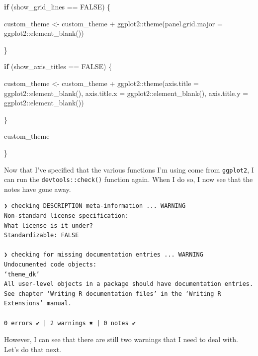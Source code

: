 \documentclass[
]{book}
\newenvironment{Shaded}{\begin{snugshade}}{\end{snugshade}}
\newcommand{\AttributeTok}[1]{\textcolor[rgb]{0.77,0.63,0.00}{#1}}
\newcommand{\ConstantTok}[1]{\textcolor[rgb]{0.00,0.00,0.00}{#1}}
\newcommand{\ControlFlowTok}[1]{\textcolor[rgb]{0.13,0.29,0.53}{\textbf{#1}}}
\newcommand{\FunctionTok}[1]{\textcolor[rgb]{0.00,0.00,0.00}{#1}}
\newcommand{\NormalTok}[1]{#1}
\newcommand{\OtherTok}[1]{\textcolor[rgb]{0.56,0.35,0.01}{#1}}
\newcommand{\SpecialCharTok}[1]{\textcolor[rgb]{0.00,0.00,0.00}{#1}}
\begin{document}
\begin{Shaded}
\begin{Highlighting}[]
  \ControlFlowTok{if}\NormalTok{ (show\_grid\_lines }\SpecialCharTok{==} \ConstantTok{FALSE}\NormalTok{) \{}
    
\NormalTok{    custom\_theme }\OtherTok{\textless{}{-}}\NormalTok{ custom\_theme }\SpecialCharTok{+}
\NormalTok{      ggplot2}\SpecialCharTok{::}\FunctionTok{theme}\NormalTok{(}\AttributeTok{panel.grid.major =}\NormalTok{ ggplot2}\SpecialCharTok{::}\FunctionTok{element\_blank}\NormalTok{())}
    
\NormalTok{  \}}
  
  \ControlFlowTok{if}\NormalTok{ (show\_axis\_titles }\SpecialCharTok{==} \ConstantTok{FALSE}\NormalTok{) \{}
    
\NormalTok{    custom\_theme }\OtherTok{\textless{}{-}}\NormalTok{ custom\_theme }\SpecialCharTok{+}
\NormalTok{      ggplot2}\SpecialCharTok{::}\FunctionTok{theme}\NormalTok{(}\AttributeTok{axis.title =}\NormalTok{ ggplot2}\SpecialCharTok{::}\FunctionTok{element\_blank}\NormalTok{(),}
                     \AttributeTok{axis.title.x =}\NormalTok{ ggplot2}\SpecialCharTok{::}\FunctionTok{element\_blank}\NormalTok{(),}
                     \AttributeTok{axis.title.y =}\NormalTok{ ggplot2}\SpecialCharTok{::}\FunctionTok{element\_blank}\NormalTok{())}
    
\NormalTok{  \}}
  
\NormalTok{  custom\_theme}
  
\NormalTok{\}}
\end{Highlighting}
\end{Shaded}

Now that I've specified that the various functions I'm using come from \texttt{ggplot2}, I can run the \texttt{devtools::check()} function again. When I do so, I now see that the notes have gone away.

\begin{verbatim}
❯ checking DESCRIPTION meta-information ... WARNING
Non-standard license specification:
What license is it under?
Standardizable: FALSE

❯ checking for missing documentation entries ... WARNING
Undocumented code objects:
‘theme_dk’
All user-level objects in a package should have documentation entries.
See chapter ‘Writing R documentation files’ in the ‘Writing R
Extensions’ manual.

0 errors ✔ | 2 warnings ✖ | 0 notes ✔
\end{verbatim}

However, I can see that there are still two warnings that I need to deal with. Let's do that next.
\end{document}
